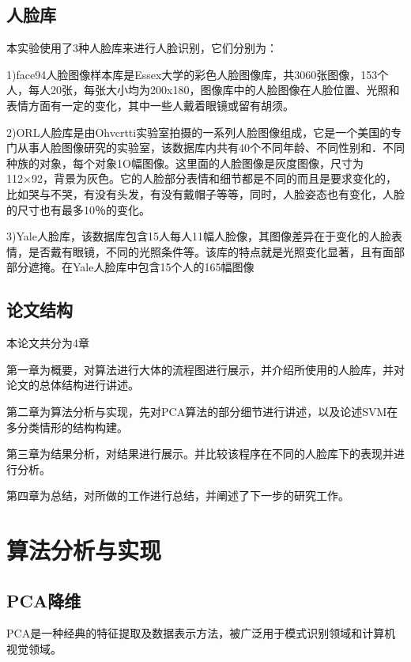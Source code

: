 \documentclass[a4paper,12pt]{ctexart}
\begin{document}
\subsection{人脸库}

本实验使用了3种人脸库来进行人脸识别，它们分别为：

1)\quad face94人脸图像样本库是Essex大学的彩色人脸图像库，共3060张图像，153个人，每人20张，每张大小均为200x180，图像库中的人脸图像在人脸位置、光照和表情方面有一定的变化，其中一些人戴着眼镜或留有胡须。

2)\quad ORL人脸库是由Ohvcrtti实验室拍摄的一系列人脸图像组成，它是一个美国的专门从事人脸图像研究的实验室，该数据库内共有40个不同年龄、不同性别和．不同种族的对象，每个对象1O幅图像。这里面的人脸图像是灰度图像，尺寸为112×92，背景为灰色。它的人脸部分表情和细节都是不同的而且是要求变化的，比如哭与不哭，有没有头发，有没有戴帽子等等，同时，人脸姿态也有变化，人脸的尺寸也有最多10％的变化。


3)\quad Yale人脸库，该数据库包含15人每人11幅人脸像，其图像差异在于变化的人脸表情，是否戴有眼镜，不同的光照条件等。该库的特点就是光照变化显著，且有面部部分遮掩。在Yale人脸库中包含15个人的165幅图像


\subsection{论文结构}
本论文共分为4章

第一章为概要，对算法进行大体的流程图进行展示，并介绍所使用的人脸库，并对论文的总体结构进行讲述。

第二章为算法分析与实现，先对PCA算法的部分细节进行讲述，以及论述SVM在多分类情形的结构构建。

第三章为结果分析，对结果进行展示。并比较该程序在不同的人脸库下的表现并进行分析。

第四章为总结，对所做的工作进行总结，并阐述了下一步的研究工作。

\newpage
\section{算法分析与实现}

\subsection{PCA降维}
PCA是一种经典的特征提取及数据表示方法，被广泛用于模式识别领域和计算机视觉领域。
\end{document}
